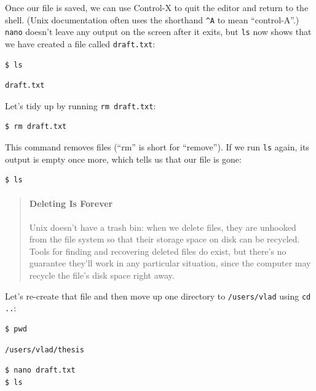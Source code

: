 \documentclass{book}
\begin{document}
Once our file is saved, we can use Control-X to quit the editor and
return to the shell. (Unix documentation often uses the shorthand
\texttt{\^{}A} to mean ``control-A''.) \texttt{nano} doesn't leave any
output on the screen after it exits, but \texttt{ls} now shows that we
have created a file called \texttt{draft.txt}:

\begin{verbatim}
$ ls
\end{verbatim}

\begin{verbatim}
draft.txt
\end{verbatim}

Let's tidy up by running \texttt{rm draft.txt}:

\begin{verbatim}
$ rm draft.txt
\end{verbatim}

This command removes files (``rm'' is short for ``remove''). If we run
\texttt{ls} again, its output is empty once more, which tells us that
our file is gone:

\begin{verbatim}
$ ls
\end{verbatim}

\begin{quote}
\mbox{}\paragraph{Deleting Is Forever}

Unix doesn't have a trash bin: when we delete files, they are unhooked
from the file system so that their storage space on disk can be
recycled. Tools for finding and recovering deleted files do exist, but
there's no guarantee they'll work in any particular situation, since the
computer may recycle the file's disk space right away.
\end{quote}

Let's re-create that file and then move up one directory to
\texttt{/users/vlad} using \texttt{cd ..}:

\begin{verbatim}
$ pwd
\end{verbatim}

\begin{verbatim}
/users/vlad/thesis
\end{verbatim}

\begin{verbatim}
$ nano draft.txt
$ ls
\end{verbatim}
\end{document}
